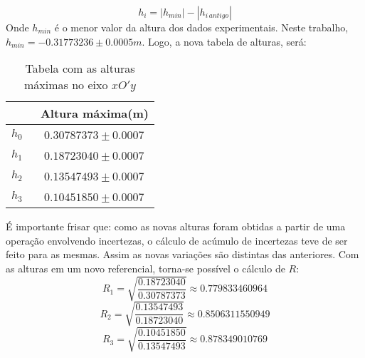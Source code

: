 \documentclass[a4paper, 12pt]{article}
\begin{document}
		$$h_i = |h_{min}|- |h_{i \, antigo}|$$
		Onde $h_{min}$ é o menor valor da altura dos dados experimentais. Neste trabalho, $h_{min} = -0.31773236 \pm 0.0005 m$. Logo, a nova tabela de alturas, será:
		\begin{table}[H]
			\centering
			\begin{tabular}{c|c}
				\hline \,  & \ Altura máxima(m) \\
				\hline $h_0$ & \ $0.30787373 \pm 0.0007$ \\
				\hline $h_1$ & \ $0.18723040 \pm 0.0007$\\
				\hline $h_2$ & \ $0.13547493 \pm 0.0007$\\
				\hline $h_3$ & \ $0.10451850 \pm 0.0007$\\
				\hline
			\end{tabular}	
			\caption{Tabela com as alturas máximas no eixo $xO'y$}
			\label{tcm}		
		\end{table}
		É importante frisar que: como as novas alturas foram obtidas a partir de uma operação envolvendo incertezas, o cálculo de acúmulo de incertezas teve de ser feito para as mesmas. Assim as novas variações são distintas das anteriores.		
		\noindent Com as alturas em um novo referencial, torna-se possível o cálculo de $R$:
		$$R_1 = \sqrt{\dfrac{0.18723040}{0.30787373}} \approx 0.779833460964$$
		$$R_2 = \sqrt{\dfrac{0.13547493}{0.18723040}} \approx 0.8506311550949$$
		$$R_3 = \sqrt{\dfrac{0.10451850}{0.13547493}} \approx 0.878349010769$$
		
\end{document}
